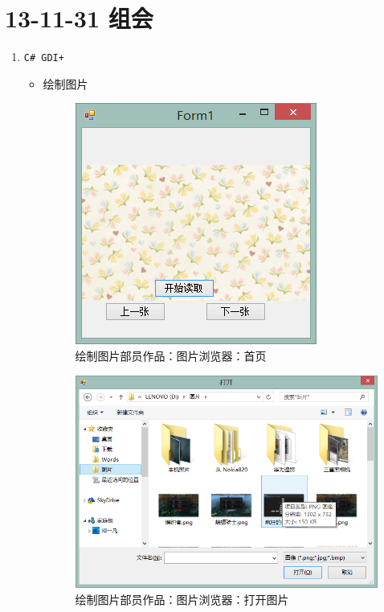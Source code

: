 \documentclass[]{report}
\begin{document}
\section{13-11-31 组会}
\begin{enumerate}
	\item \verb|C# GDI+|
	\begin{itemize}
		\item 绘制图片
\begin{figure}
\centering
\includegraphics[width=0.7\linewidth]{./PIC/DengPic0}
\caption{绘制图片部员作品：图片浏览器：首页}
\label{fig:DengPic0}
\end{figure}
\begin{figure}
\centering
\includegraphics[width=0.7\linewidth]{./PIC/DengPic1}
\caption{绘制图片部员作品：图片浏览器：打开图片}
\label{fig:DengPic0}
\end{figure}
\begin{figure}
\centering

\end{figure}
\end{itemize}
\end{enumerate}
\end{document}
